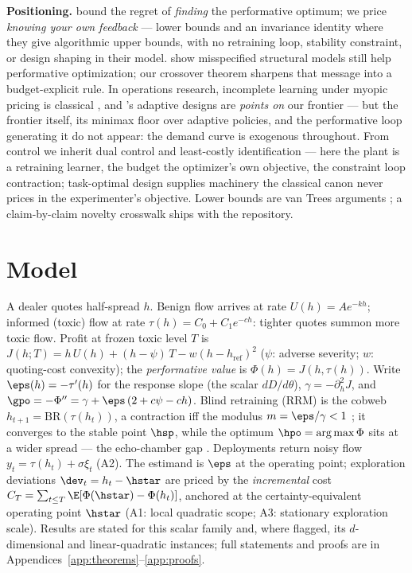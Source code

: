 \documentclass{article}
\begin{document}
\textbf{Positioning.} \citet{jagadeesan2022regret} bound the regret of \emph{finding} the performative optimum; we price \emph{knowing your own feedback} --- lower bounds and an invariance identity where they give algorithmic upper bounds, with no retraining loop, stability constraint, or design shaping in their model. \citet{lin2024plugin} show misspecified structural models still help performative optimization; our crossover theorem sharpens that message into a budget-explicit rule. In operations research, incomplete learning under myopic pricing is classical \citep{rothschild1974two,harrison2012bayesian,keskin2014dynamic,broder2012dynamic,denboer2015dynamic}, and \citet{lai1979adaptive}'s adaptive designs are \emph{points on} our frontier --- but the frontier itself, its minimax floor over adaptive policies, and the performative loop generating it do not appear: the demand curve is exogenous throughout. From control we inherit dual control \citep{feldbaum1960dual} and least-costly identification \citep{bombois2006least} --- here the plant is a retraining learner, the budget the optimizer's own objective, the constraint loop contraction; task-optimal design \citep{wagenmaker2021task,dean2020sample} supplies machinery the classical canon \citep{kiefer1960equivalence,pukelsheim2006optimal} never prices in the experimenter's objective. Lower bounds are van Trees arguments \citep{gill1995applications}; a claim-by-claim novelty crosswalk ships with the repository.

\section{Model}
\label{sec:model}

A dealer quotes half-spread $h$. Benign flow arrives at rate $U(h) = A e^{-kh}$; informed (toxic) flow at rate $\tau(h) = C_0 + C_1 e^{-c h}$: tighter quotes summon more toxic flow. Profit at frozen toxic level $T$ is $J(h;T) = h\,U(h) + (h - \psi)\,T - w (h - h_{\mathrm{ref}})^2$ ($\psi$: adverse severity; $w$: quoting-cost convexity); the \emph{performative value} is $\Phi(h) = J(h,\tau(h))$. Write $\eps(h) = -\tau'(h)$ for the response slope (the scalar $dD/d\theta$), $\gamma = -\partial^2_h J$, and $\gpo = -\Phi'' = \gamma + \eps\,(2 + c\psi - ch)$. Blind retraining (RRM) is the cobweb $h_{t+1} = \mathrm{BR}(\tau(h_t))$, a contraction iff the modulus $m = \eps/\gamma < 1$ \citep{perdomo2020performative}; it converges to the stable point $\hsp$, while the optimum $\hpo = \arg\max\Phi$ sits at a wider spread --- the echo-chamber gap \citep{miller2021outside}. Deployments return noisy flow $y_t = \tau(h_t) + \sigma\xi_t$ (A2). The estimand is $\eps$ at the operating point; exploration deviations $\dev_t = h_t - \hstar$ are priced by the \emph{incremental} cost $C_T = \sum_{t \le T} \E[\Phi(\hstar) - \Phi(h_t)]$, anchored at the certainty-equivalent operating point $\hstar$ (A1: local quadratic scope; A3: stationary exploration scale). Results are stated for this scalar family and, where flagged, its $d$-dimensional and linear-quadratic instances; full statements and proofs are in Appendices~\ref{app:theorems}--\ref{app:proofs}.
\end{document}
